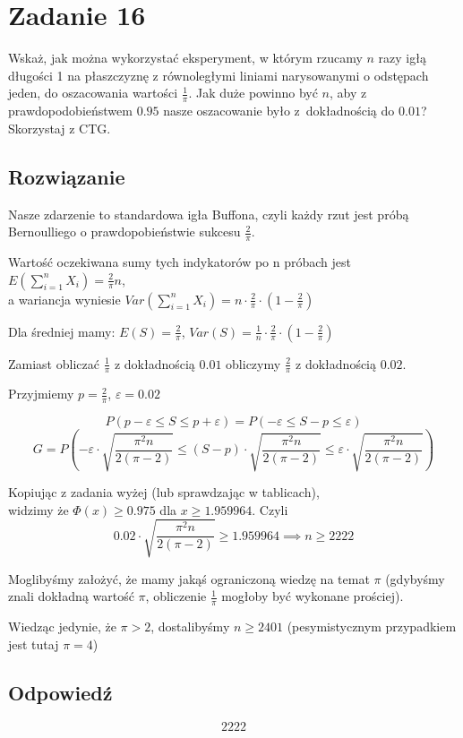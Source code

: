 \section{Zadanie 16}
Wskaż, jak można wykorzystać eksperyment, w którym rzucamy \(n\)
razy igłą długości 1 na płaszczyznę z równoległymi liniami narysowanymi
o odstępach jeden,
do oszacowania wartości \(\frac{1}{\pi}\). Jak duże powinno być \(n\),
aby z prawdopodobieństwem \(0.95\) nasze oszacowanie było z~dokładnością
do \(0.01\)? Skorzystaj z CTG.

\subsection*{Rozwiązanie}
Nasze zdarzenie to standardowa igła Buffona,
czyli każdy rzut jest próbą Bernoulliego o prawdopobieństwie
sukcesu \(\frac{2}{\pi}\).

Wartość oczekiwana sumy tych indykatorów po n próbach jest
\(E(\sum_{i=1}^n X_i) = \frac{2}{\pi}n\),\\
a wariancja wyniesie
\(Var(\sum_{i=1}^n X_i) = n \cdot \frac{2}{\pi} \cdot
\left(1-\frac{2}{\pi}\right)\)

Dla średniej mamy: \(E(S) = \frac{2}{\pi}\),
\(Var(S) = \frac{1}{n} \cdot \frac{2}{\pi} \cdot
\left(1-\frac{2}{\pi}\right)\)

Zamiast obliczać \(\frac{1}{\pi}\) z dokładnością \(0.01\)
obliczymy \(\frac{2}{\pi}\) z dokładnością \(0.02\).

Przyjmiemy \(p=\frac{2}{\pi}\), \(\varepsilon = 0.02\)

\[
	P(p-\varepsilon \leqslant S \leqslant p+\varepsilon)
	= P(-\varepsilon \leqslant S-p \leqslant \varepsilon)
\]
\[G
	= P\left(
	-\varepsilon \cdot \sqrt{\frac{\pi^2n}{2(\pi - 2)}}
	\leqslant (S-p) \cdot \sqrt{\frac{\pi^2n}{2(\pi - 2)}}
	\leqslant \varepsilon \cdot \sqrt{\frac{\pi^2n}{2(\pi - 2)}}
	\right)
\]

Kopiując z zadania wyżej (lub sprawdzając w tablicach),\\ widzimy że
\(\Phi(x) \geq 0.975\) dla \(x \geq 1.959964\). Czyli
\[
	0.02 \cdot \sqrt{\frac{\pi^2n}{2(\pi - 2)}}
	\geqslant 1.959964 \implies n \geqslant 2222
\]

Moglibyśmy założyć, że mamy jakąś ograniczoną wiedzę na
temat \(\pi\) (gdybyśmy znali dokładną wartość \(\pi\), obliczenie
\(\frac{1}{\pi}\) mogłoby być wykonane prościej).

Wiedząc jedynie, że \(\pi > 2\), dostalibyśmy \(n \geqslant 2401\)
(pesymistycznym przypadkiem jest tutaj \(\pi = 4\))



\subsection*{Odpowiedź}
\[
	\boxed{\text{2222}}
\]
